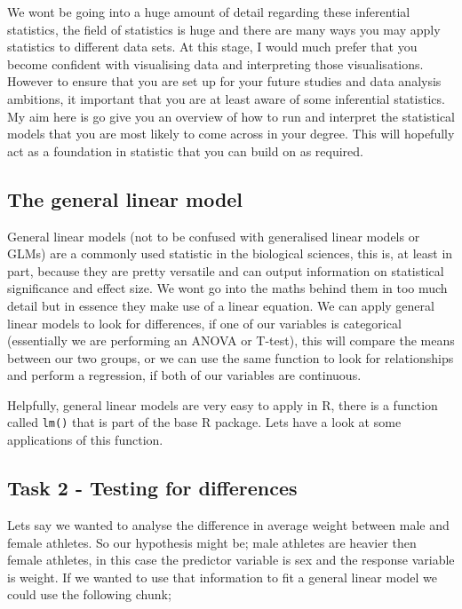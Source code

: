 \documentclass[
]{book}
\begin{document}
We wont be going into a huge amount of detail regarding these inferential statistics, the field of statistics is huge and there are many ways you may apply statistics to different data sets. At this stage, I would much prefer that you become confident with visualising data and interpreting those visualisations. However to ensure that you are set up for your future studies and data analysis ambitions, it important that you are at least aware of some inferential statistics. My aim here is go give you an overview of how to run and interpret the statistical models that you are most likely to come across in your degree. This will hopefully act as a foundation in statistic that you can build on as required.

\hypertarget{the-general-linear-model}{%
\subsection{The general linear model}\label{the-general-linear-model}}

General linear models (not to be confused with generalised linear models or GLMs) are a commonly used statistic in the biological sciences, this is, at least in part, because they are pretty versatile and can output information on statistical significance and effect size. We wont go into the maths behind them in too much detail but in essence they make use of a linear equation. We can apply general linear models to look for differences, if one of our variables is categorical (essentially we are performing an ANOVA or T-test), this will compare the means between our two groups, or we can use the same function to look for relationships and perform a regression, if both of our variables are continuous.

Helpfully, general linear models are very easy to apply in R, there is a function called \texttt{lm()} that is part of the base R package. Lets have a look at some applications of this function.

\hypertarget{task-2---testing-for-differences}{%
\subsection{Task 2 - Testing for differences}\label{task-2---testing-for-differences}}

Lets say we wanted to analyse the difference in average weight between male and female athletes. So our hypothesis might be; male athletes are heavier then female athletes, in this case the predictor variable is sex and the response variable is weight. If we wanted to use that information to fit a general linear model we could use the following chunk;
\end{document}
